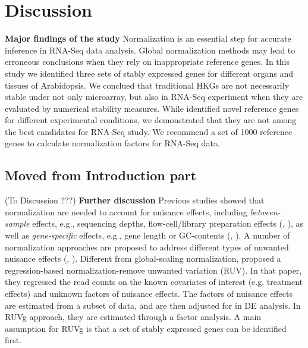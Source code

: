 \documentclass[11pt, a4paper]{article}
\begin{document}
  \section{Discussion}
  \textbf{Major findings of the study}
  Normalization is an essential step for accurate inference in RNA-Seq data analysis. Global normalization methods may lead to erroneous conclusions when they rely on inappropriate reference genes. In this study we identified three sets of stably expressed genes for different organs and tissues of Arabidopsis. We conclued that traditional HKGs are not necessarily stable under not only microarray, but also in RNA-Seq experiment when they are evaluated by numerical stability measures. While \cite{czechowski2005genome} identified novel reference genes for different experimental conditions, we demonstrated that they are not among the best candidates for RNA-Seq study. We recommend a set of 1000 reference genes to calculate normalization factors for RNA-Seq data.  
   



\subsection{Moved from Introduction part}



(To Discussion ???) {\bf Further discussion} Previous studies showed that
normalization are needed to account for nuisance effects, including
\textit{between-sample} effects, e.g., sequencing depths, flow-cell/library
preparation effects (\cite{bullard2010evaluation},
\cite{robinson2010scaling}), as well as \textit{gene-specific} effects, e.g.,
gene length or GC-contents (\cite{risso2011gc}, \cite{hansen2012removing}). A
number of normalization approaches are proposed to address different types of
unwanted nuisance effects (\cite{dillies2013comprehensive},
\cite{risso2014nat}). Different from global-scaling normalization,
\cite{risso2014nat}  proposed a regression-based normalization-remove unwanted
variation (RUV).  In that paper, they regressed the read counts on the known
covariates of interest (e.g. treatment effects) and unknown factors of
nuisance effects. The factors of nuisance effects are estimated from a subset
of data, and are then adjusted for in DE analysis. In RUVg approach, they are
estimated through a factor analysis. A main assumption for RUVg is that a set
of stably expressed genes can be identified first.
\end{document}
